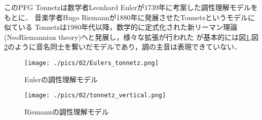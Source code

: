 このPFG Tonnetzは数学者Leonhard Eulerが1739年に考案した調性理解モデルをもとに．
音楽学者Hugo Riemannが1880年に発展させたTonnetzというモデルに似ている
Tonnetzは1980年代以降，数学的に定式化された新リーマン理論(NeoRiemannian theory)へと発展し，様々な拡張が行われた\cite{behringer10}%
が基本的には図\ref{img:euler},図\ref{img:riemann}のように音名同士を繋いだモデルであり，調の主音は表現できていない．
\begin{figure}[t]
	\begin{center}
		\texttt{[image: ./pics/02/Eulers\_tonnetz.png]}
		\caption{Eulerの調性理解モデル\cite{shiramatsu2015}}
		\label{img:euler} 
	\end{center}
\end{figure}
\begin{figure}[t]
	\begin{center}
		\texttt{[image: ./pics/02/tonnetz\_vertical.png]}
		\caption{Riemannの調性理解モデル\cite{shiramatsu2015}}
		\label{img:riemann} 
	\end{center}
\end{figure}

